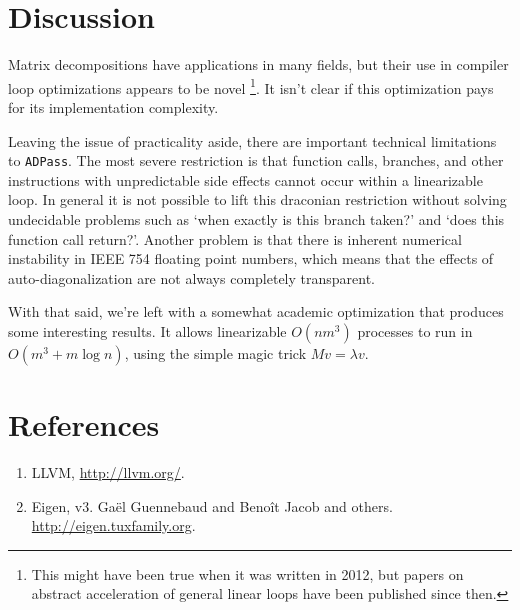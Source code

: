 \documentclass[10pt]{article}
\begin{document}
\section{Discussion}

Matrix decompositions have applications in many fields, but their use in
compiler loop optimizations appears to be novel \footnote{This might have
been true when it was written in 2012, but papers on abstract acceleration
of general linear loops have been published since then.}. It isn't clear if
this optimization pays for its implementation complexity.

Leaving the issue of practicality aside, there are important technical
limitations to \texttt{ADPass}. The most severe restriction is that function
calls, branches, and other instructions with unpredictable side effects
cannot occur within a linearizable loop. In general it is not possible to
lift this draconian restriction without solving undecidable problems such as
`when exactly is this branch taken?' and `does this function call return?'.
Another problem is that there is inherent numerical instability in IEEE 754
floating point numbers, which means that the effects of auto-diagonalization
are not always completely transparent.

With that said, we're left with a somewhat academic optimization that
produces some interesting results. It allows linearizable $O(nm^3)$
processes to run in $O(m^3 + m\log n)$, using the simple magic trick $Mv =
\lambda v$.

\section{References}

\begin{enumerate}[1.]
    \item LLVM, \url{http://llvm.org/}.
    \item Eigen, v3. Ga\"{e}l Guennebaud and Beno\^{i}t Jacob and others.
        \url{http://eigen.tuxfamily.org}.
\end{enumerate}
\end{document}
